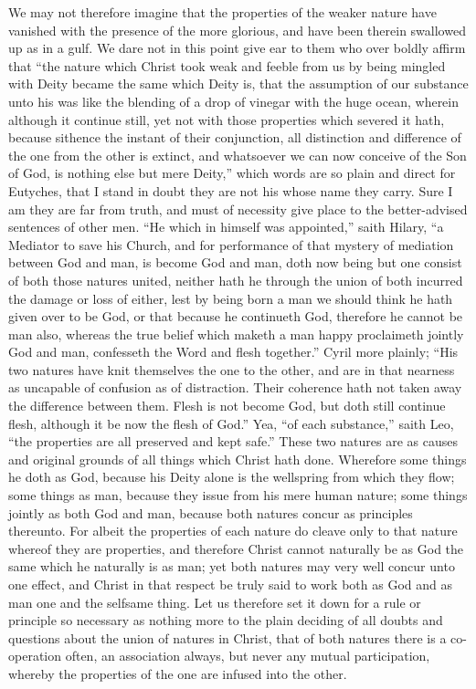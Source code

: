 We may not therefore imagine that the properties of the weaker nature have vanished with the presence of the more glorious, and have been therein swallowed up as in a gulf. We dare not in this point give ear to them who over boldly affirm that “the nature which Christ took weak and feeble from us by being mingled with Deity became the same which Deity is, that the assumption of our substance unto his was like the blending of a drop of vinegar with the huge ocean, wherein although it continue still, yet not with those properties which severed it hath, because sithence the instant of their conjunction, all distinction and difference of the one from the other is extinct, and whatsoever we can now conceive of the Son of God, is nothing else but mere Deity,” which words are so plain and direct for Eutyches, that I stand in doubt they are not his whose name they carry. Sure I am they are far from truth, and must of necessity give place to  the better-advised sentences of other men. “He which in himself was appointed,” saith Hilary, “a Mediator to save his Church, and for performance of that mystery of mediation between God and man, is become God and man, doth now being but one consist of both those natures united, neither hath he through the union of both incurred the damage or loss of either, lest by being born a man we should think he hath given over to be God, or that because he continueth God, therefore he cannot be man also, whereas the true belief which maketh a man happy proclaimeth jointly God and man, confesseth the Word and flesh together.” Cyril more plainly; “His two natures have knit themselves the one to the other, and are in that nearness as uncapable of confusion as of distraction. Their coherence hath not taken away the difference between them. Flesh is not become God, but doth still continue flesh, although it be now the flesh of God.” Yea, “of each substance,” saith Leo, “the properties are all preserved and kept safe.”
These two natures are as causes and original grounds of all things which Christ hath done. Wherefore some things he doth as God, because his Deity alone is the wellspring from which they flow; some things as man, because they issue from his mere human nature; some things jointly as both God and man, because both natures concur as principles thereunto. For albeit the properties of each nature do cleave only to that nature whereof they are properties, and therefore Christ cannot naturally be as God the same which he naturally is as man; yet both natures may very well concur unto one effect, and Christ in that respect be truly said to work  both as God and as man one and the selfsame thing. Let us therefore set it down for a rule or principle so necessary as nothing more to the plain deciding of all doubts and questions about the union of natures in Christ, that of both natures there is a co-operation often, an association always, but never any mutual participation, whereby the properties of the one are infused into the other.
